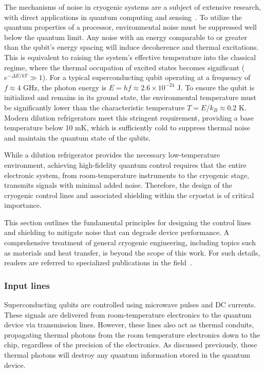 \documentclass[a4paper,onecolumn,11pt,unpublished]{quantumarticle}
\begin{document}
The mechanisms of noise in cryogenic systems are a subject of extensive research, with direct applications in quantum computing and sensing~\cite{Viennot2014Charge,Gabelli2006Evidence, Corcoles2011Protecting, Goetz2017Secondorder,Krinner2019Engineering,Yan2018Distinguishing,Baur2012Realizing,Boehme2016Characterisation,Krantz2016The,Wang2018The,Nguyen2020Toward,Zhang2021Universal,Arute2019Quantum,Wu2021Strong,Bao2022Fluxonium}. To utilize the quantum properties of a processor, environmental noise must be suppressed well below the quantum limit. Any noise with an energy comparable to or greater than the qubit's energy spacing will induce decoherence and thermal excitations. This is equivalent to raising the system's effective temperature into the classical regime, where the thermal occupation of excited states becomes significant ($e^{-\Delta E / kT}\gg 1$). For a typical superconducting qubit operating at a frequency of $f \approx 4$ GHz, the photon energy is $E=hf \approx 2.6\times10^{-24}$ J. To ensure the qubit is initialized and remains in its ground state, the environmental temperature must be significantly lower than the characteristic temperature $T = E/k_B \approx 0.2$ K. Modern dilution refrigerators meet this stringent requirement, providing a base temperature below 10 mK, which is sufficiently cold to suppress thermal noise and maintain the quantum state of the qubits.

While a dilution refrigerator provides the necessary low-temperature environment, achieving high-fidelity quantum control requires that the entire electronic system, from room-temperature instruments to the cryogenic stage, transmits signals with minimal added noise. Therefore, the design of the cryogenic control lines and associated shielding within the cryostat is of critical importance. 

This section outlines the fundamental principles for designing the control lines and shielding to mitigate noise that can degrade device performance. A comprehensive treatment of general cryogenic engineering, including topics such as materials and heat transfer, is beyond the scope of this work. For such details, readers are referred to specialized publications in the field~\cite{BookCryogenics2022,BookTheArtOfCryogenics2008,BookAnIntroductionToMillikelvinTechnology1989,BookCryogenicEngineering2004}.

\subsubsection{Input lines\label{subsec:input_lines}}
Superconducting qubits are controlled using microwave pulses and DC currents. These signals are delivered from room-temperature electronics to the quantum device via transmission lines. However, these lines also act as thermal conduits, propagating thermal photons from the room temperature electronics down to the chip, regardless of the precision of the electronics. As discussed previously, these thermal photons will destroy any quantum information stored in the quantum device.
\end{document}
